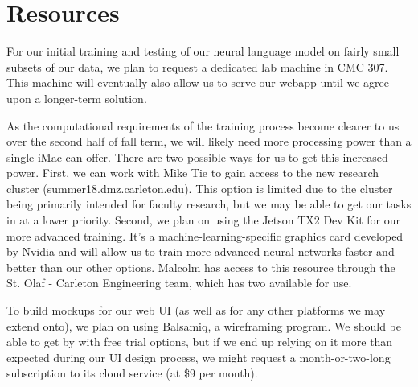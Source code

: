\section{Resources}\label{sec:resources}
For our initial training and testing of our neural language model on fairly small
subsets of our data, we plan to request a dedicated lab machine in CMC 307.
This machine will eventually also allow us to serve our webapp until we agree
upon a longer-term solution.

As the computational requirements of the training process become clearer to us
over the second half of fall term, we will likely need more processing power
than a single iMac can offer.  There are two possible ways for us to get this
increased power. First, we can work with Mike Tie to gain access to the new
research cluster (summer18.dmz.carleton.edu).  This option is limited due to the
cluster being primarily intended for faculty research, but we may be able to get
our tasks in at a lower priority. Second, we plan on using the Jetson TX2 Dev Kit
for our more advanced training. It’s a machine-learning-specific graphics card
developed by Nvidia and will allow us to train more advanced neural networks
faster and better than our other options. Malcolm has access to this resource
through the St. Olaf - Carleton Engineering team, which has two available for use.

To build mockups for our web UI (as well as for any other platforms we may extend
onto), we plan on using Balsamiq, a wireframing program.  We should be able to
get by with free trial options, but if we end up relying on it more than expected
during our UI design process, we might request a month-or-two-long subscription
to its cloud service (at \$9 per month).

